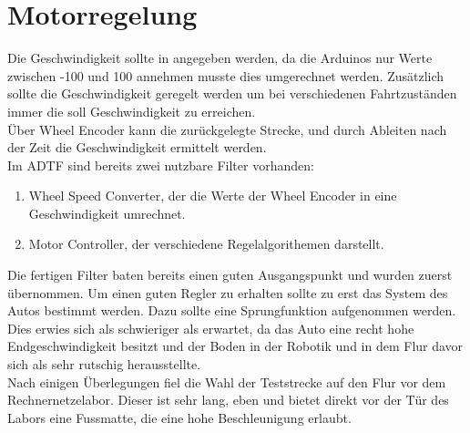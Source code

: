 \documentclass[a4paper,12pt]{report}
\begin{document}

\chapter{Motorregelung}

	Die Geschwindigkeit sollte in \meter\per\second\usk angegeben werden, da die Arduinos nur Werte zwischen -100 und 100 annehmen musste dies umgerechnet werden. Zusätzlich sollte die Geschwindigkeit geregelt werden um bei verschiedenen Fahrtzuständen immer die soll Geschwindigkeit zu erreichen. \\
	Über Wheel Encoder kann die zurückgelegte Strecke, und durch Ableiten nach der Zeit die Geschwindigkeit ermittelt werden. \\
	Im ADTF sind bereits zwei nutzbare Filter vorhanden:
	\begin{enumerate}[label=]
		\item Wheel Speed Converter, der die Werte der Wheel Encoder in eine Geschwindigkeit umrechnet. \\
		\item Motor Controller, der verschiedene Regelalgorithemen darstellt.	%
	\end{enumerate}
	Die fertigen Filter baten bereits einen guten Ausgangspunkt und wurden zuerst übernommen. Um einen guten Regler zu erhalten sollte zu erst das System des Autos bestimmt werden. Dazu sollte eine Sprungfunktion aufgenommen werden. Dies erwies sich als schwieriger als erwartet, da das Auto eine recht hohe Endgeschwindigkeit besitzt und der Boden in der Robotik und in dem Flur davor sich als sehr rutschig herausstellte. \\
	Nach einigen Überlegungen fiel die Wahl der Teststrecke auf den Flur vor dem Rechnernetzelabor. Dieser ist sehr lang, eben und bietet direkt vor der Tür des Labors eine Fussmatte, die eine hohe Beschleunigung erlaubt. \\
\end{document}
